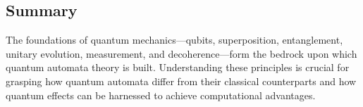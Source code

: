 
\subsection{Summary}
\label{subsec:quantum_summary}

The foundations of quantum mechanics—qubits, superposition, entanglement, unitary evolution, measurement, and decoherence—form the bedrock upon which quantum automata theory is built. Understanding these principles is crucial for grasping how quantum automata differ from their classical counterparts and how quantum effects can be harnessed to achieve computational advantages.
